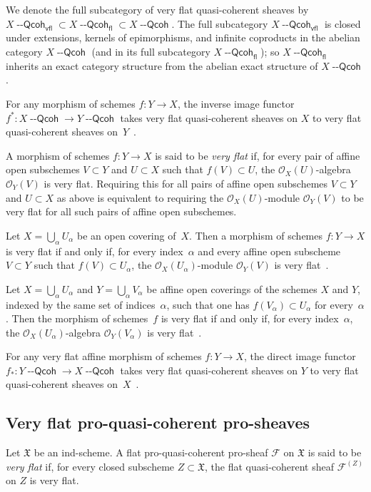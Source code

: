 \documentclass[12pt,a4paper]{amsart}
\newcommand{\+}{\protect\nobreakdash-}
\renewcommand{\:}{\colon}
\newcommand{\rarrow}{\longrightarrow}
\newcommand{\Qcoh}{{\operatorname{\mathsf{--Qcoh}}}}
\newcommand{\fl}{\mathsf{fl}}
\newcommand{\vfl}{\mathsf{vfl}}
\newcommand{\cO}{\mathcal O}
\newcommand{\fX}{\mathfrak X}
\newcommand{\rF}{\mathscr F}
\theoremstyle{plain}
\theoremstyle{definition}
\begin{document}
 We denote the full subcategory of very flat quasi-coherent sheaves
by $X\Qcoh_\vfl\subset X\Qcoh_\fl\subset X\Qcoh$.
 The full subcategory $X\Qcoh_\vfl$ is closed under extensions,
kernels of epimorphisms, and infinite coproducts in the abelian
category $X\Qcoh$ (and in its full subcategory $X\Qcoh_\fl$);
so $X\Qcoh_\fl$ inherits an exact category structure from the abelian
exact structure of $X\Qcoh$.
 
 For any morphism of schemes $f\:Y\rarrow X$, the inverse image functor
$f^*\:X\Qcoh\allowbreak\rarrow Y\Qcoh$ takes very flat quasi-coherent
sheaves on $X$ to very flat quasi-coherent sheaves on~$Y$
\,\cite[Lemma~1.2.2(b) and Section~1.10]{Pcosh}.

 A morphism of schemes $f\:Y\rarrow X$ is said to be \emph{very flat}
if, for every pair of affine open subschemes $V\subset Y$ and
$U\subset X$ such that $f(V)\subset U$, the $\cO_X(U)$\+algebra
$\cO_Y(V)$ is very flat.
 Requiring this for all pairs of affine open subschemes $V\subset Y$
and $U\subset X$ as above is equivalent to requiring
the $\cO_X(U)$\+module $\cO_Y(V)$ to be very flat for all such
pairs of affine open subschemes.

 Let $X=\bigcup_\alpha U_\alpha$ be an open covering of~$X$.
 Then a morphism of schemes $f\:Y\rarrow X$ is very flat if and only
if, for every index~$\alpha$ and every affine open subscheme
$V\subset Y$ such that $f(V)\subset U_\alpha$,
the $\cO_X(U_\alpha)$\+module $\cO_Y(V)$ is very
flat~\cite[Corollary~1.2.5(b), Lemma~1.2.6(a), and Section~1.10]{Pcosh}.

 Let $X=\bigcup_\alpha U_\alpha$ and $Y=\bigcup_\alpha V_\alpha$
be affine open coverings of the schemes $X$ and $Y$, indexed by
the same set of indices~$\alpha$, such that one has $f(V_\alpha)
\subset U_\alpha$ for every~$\alpha$.
 Then the morphism of schemes~$f$ is very flat if and only if, for
every index~$\alpha$, the $\cO_X(U_\alpha)$\+algebra $\cO_Y(V_\alpha)$
is very flat~\cite[Lemma~1.8.6 and Section~1.10]{Pcosh}.

 For any very flat affine morphism of schemes $f\:Y\rarrow X$,
the direct image functor $f_*\:Y\Qcoh\rarrow X\Qcoh$ takes very flat
quasi-coherent sheaves on $Y$ to very flat quasi-coherent sheaves
on~$X$ \,\cite[Lemma~1.2.3(b) and Section~1.10]{Pcosh}.

\subsection{Very flat pro-quasi-coherent pro-sheaves}
 Let $\fX$ be an ind-scheme.
 A flat pro-quasi-coherent pro-sheaf $\rF$ on $\fX$ is said to be
\emph{very flat} if, for every closed subscheme $Z\subset\fX$,
the flat quasi-coherent sheaf $\rF^{(Z)}$ on $Z$ is very flat.
\end{document}
